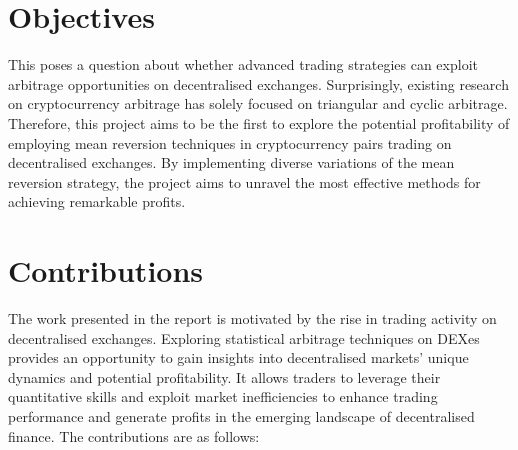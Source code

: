 \section{Objectives}
This poses a question about whether advanced trading strategies can exploit arbitrage opportunities on decentralised exchanges. Surprisingly, existing research on cryptocurrency arbitrage has solely focused on triangular and cyclic arbitrage. Therefore, this project aims to be the first to explore the potential profitability of employing mean reversion techniques in cryptocurrency pairs trading on decentralised exchanges. By implementing diverse variations of the mean reversion strategy, the project aims to unravel the most effective methods for achieving remarkable profits.

\section{Contributions}
The work presented in the report is motivated by the rise in trading activity on decentralised exchanges. Exploring statistical arbitrage techniques on DEXes provides an opportunity to gain insights into decentralised markets' unique dynamics and potential profitability. It allows traders to leverage their quantitative skills and exploit market inefficiencies to enhance trading performance and generate profits in the emerging landscape of decentralised finance. The contributions are as follows:
